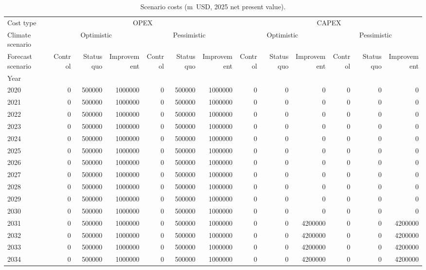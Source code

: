 \begin{table}
\caption{Scenario costs (m~USD, 2025 net present value).}
\label{tab:scenario_costs_KHM}
\centering
\begin{tabular}{lrrrrrrrrrrrr}
\toprule
Cost type & \multicolumn{6}{c}{OPEX} & \multicolumn{6}{c}{CAPEX} \\
Climate scenario & \multicolumn{3}{c}{Optimistic} & \multicolumn{3}{c}{Pessimistic} & \multicolumn{3}{c}{Optimistic} & \multicolumn{3}{c}{Pessimistic} \\
Forecast scenario & Control & Status quo & Improvement & Control & Status quo & Improvement & Control & Status quo & Improvement & Control & Status quo & Improvement \\
Year &  &  &  &  &  &  &  &  &  &  &  &  \\
\midrule
2020 & 0 & 500000 & 1000000 & 0 & 500000 & 1000000 & 0 & 0 & 0 & 0 & 0 & 0 \\
2021 & 0 & 500000 & 1000000 & 0 & 500000 & 1000000 & 0 & 0 & 0 & 0 & 0 & 0 \\
2022 & 0 & 500000 & 1000000 & 0 & 500000 & 1000000 & 0 & 0 & 0 & 0 & 0 & 0 \\
2023 & 0 & 500000 & 1000000 & 0 & 500000 & 1000000 & 0 & 0 & 0 & 0 & 0 & 0 \\
2024 & 0 & 500000 & 1000000 & 0 & 500000 & 1000000 & 0 & 0 & 0 & 0 & 0 & 0 \\
2025 & 0 & 500000 & 1000000 & 0 & 500000 & 1000000 & 0 & 0 & 0 & 0 & 0 & 0 \\
2026 & 0 & 500000 & 1000000 & 0 & 500000 & 1000000 & 0 & 0 & 0 & 0 & 0 & 0 \\
2027 & 0 & 500000 & 1000000 & 0 & 500000 & 1000000 & 0 & 0 & 0 & 0 & 0 & 0 \\
2028 & 0 & 500000 & 1000000 & 0 & 500000 & 1000000 & 0 & 0 & 0 & 0 & 0 & 0 \\
2029 & 0 & 500000 & 1000000 & 0 & 500000 & 1000000 & 0 & 0 & 0 & 0 & 0 & 0 \\
2030 & 0 & 500000 & 1000000 & 0 & 500000 & 1000000 & 0 & 0 & 0 & 0 & 0 & 0 \\
2031 & 0 & 500000 & 1000000 & 0 & 500000 & 1000000 & 0 & 0 & 4200000 & 0 & 0 & 4200000 \\
2032 & 0 & 500000 & 1000000 & 0 & 500000 & 1000000 & 0 & 0 & 4200000 & 0 & 0 & 4200000 \\
2033 & 0 & 500000 & 1000000 & 0 & 500000 & 1000000 & 0 & 0 & 4200000 & 0 & 0 & 4200000 \\
2034 & 0 & 500000 & 1000000 & 0 & 500000 & 1000000 & 0 & 0 & 4200000 & 0 & 0 & 4200000 \\

\end{tabular}
\end{table}
